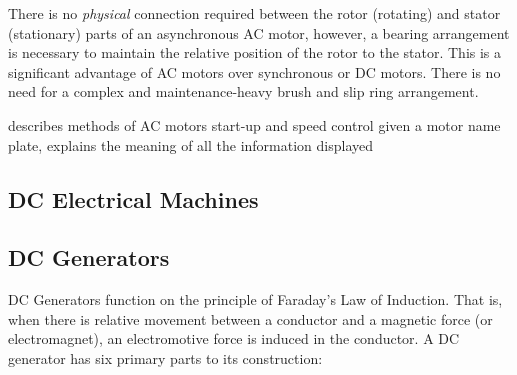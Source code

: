 \documentclass[11pt,a4paper]{article}
\begin{document}
There is no \textit{physical} connection required between the rotor (rotating) and stator (stationary) parts of an asynchronous AC motor, however, a bearing arrangement is necessary to maintain the relative position of the rotor to the stator. This is a significant advantage of AC motors over synchronous or DC motors. There is no need for a complex and maintenance-heavy brush and slip ring arrangement.

describes methods of AC motors start-up and speed control
given a motor name plate, explains the meaning of all the information displayed
\subsection{DC Electrical Machines}
\subsection{DC Generators}
DC Generators function on the principle of Faraday's Law of Induction. That is, when there is relative movement between a conductor and a magnetic force (or electromagnet), an electromotive force is induced in the conductor. A DC generator has six primary parts to its construction:
\end{document}
